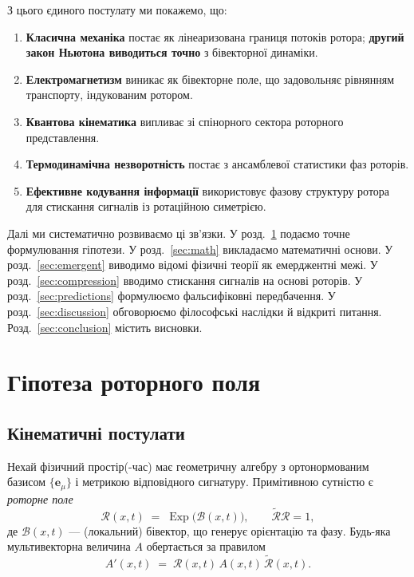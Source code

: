 \documentclass[11pt,a4paper]{article}
\newcommand{\e}{\mathbf{e}}
\newcommand{\rev}[1]{\widetilde{#1}}           %
\newcommand{\Exp}{\operatorname{Exp}}
\newcommand{\Rotor}{\mathcal{R}}
\newcommand{\Biv}{\mathcal{B}}
\theoremstyle{definition}
\theoremstyle{plain}
\theoremstyle{remark}
\begin{document}
З цього єдиного постулату ми покажемо, що:

\begin{enumerate}[leftmargin=*,itemsep=3pt]
  \item \textbf{Класична механіка} постає як лінеаризована границя потоків ротора; \textbf{другий закон Ньютона виводиться точно} з бівекторної динаміки.
  \item \textbf{Електромагнетизм} виникає як бівекторне поле, що задовольняє рівнянням транспорту, індукованим ротором.
  \item \textbf{Квантова кінематика} випливає зі спінорного сектора роторного представлення.
  \item \textbf{Термодинамічна незворотність} постає з ансамблевої статистики фаз роторів.
  \item \textbf{Ефективне кодування інформації} використовує фазову структуру ротора для стискання сигналів із ротаційною симетрією.
\end{enumerate}

Далі ми систематично розвиваємо ці зв’язки. У розд.~\ref{sec:hypothesis} подаємо точне формулювання гіпотези. У розд.~\ref{sec:math} викладаємо математичні основи. У розд.~\ref{sec:emergent} виводимо відомі фізичні теорії як емерджентні межі. У розд.~\ref{sec:compression} вводимо стискання сигналів на основі роторів. У розд.~\ref{sec:predictions} формулюємо фальсифіковні передбачення. У розд.~\ref{sec:discussion} обговорюємо філософські наслідки й відкриті питання. Розд.~\ref{sec:conclusion} містить висновки.

\vspace{1em}

\section{Гіпотеза роторного поля}\label{sec:hypothesis}

\subsection{Кінематичні постулати}

Нехай фізичний простір(-час) має геометричну алгебру з ортонормованим базисом $\{\e_\mu\}$ і метрикою відповідного сигнатуру. Примітивною сутністю є \emph{роторне поле}
\begin{equation}
  \Rotor(x,t) \;=\; \Exp\!\big(\Biv(x,t)\big),
  \qquad \rev{\Rotor}\Rotor = 1,
  \label{eq:rotor}
\end{equation}
де $\Biv(x,t)$ — (локальний) бівектор, що генерує орієнтацію та фазу. Будь-яка мультивекторна величина $A$ обертається за правилом
\begin{equation}
  A'(x,t) \;=\; \Rotor(x,t)\, A(x,t)\, \rev{\Rotor}(x,t).
\end{equation}
\end{document}
